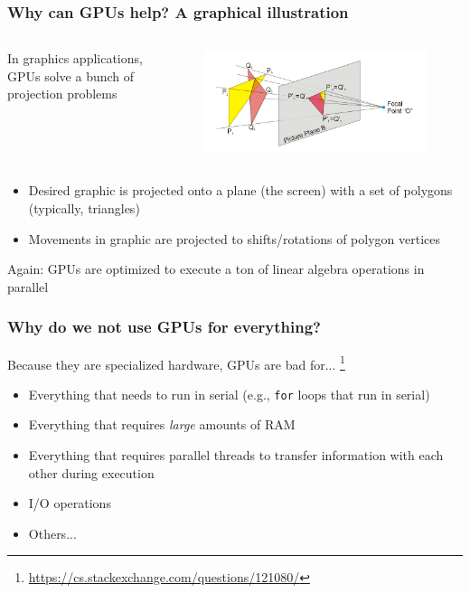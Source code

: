\documentclass[10pt, aspectratio=1610]{beamer}
\begin{document}
\begin{frame}
  \frametitle{Why can GPUs help? A graphical illustration}


  \begin{columns}
    \begin{column}{0.4\textwidth}
      In graphics applications, GPUs solve a bunch of projection problems
    \end{column}
    \begin{column}{0.5\textwidth}
      \begin{figure}
        \centering
        \includegraphics[width=\textwidth]{./img/Perspective_Projection_Principle.jpg}
      \end{figure}
    \end{column}
  \end{columns}

  \begin{itemize}
    \item Desired graphic is projected onto a plane (the screen) with a set of polygons (typically, triangles)
    \item Movements in graphic are projected to shifts/rotations of polygon vertices
  \end{itemize}

  Again: GPUs are optimized to execute a ton of linear algebra operations in parallel

\end{frame}

\begin{frame}
  \frametitle{Why do we not use GPUs for everything?}

  Because they are specialized hardware, GPUs are bad for...%
    \footnote{
      \url{https://cs.stackexchange.com/questions/121080/}
    }

  \begin{itemize}
    \item
      Everything that needs to run in serial (e.g., \texttt{for} loops that run in serial)
    \item
      Everything that requires \emph{large} amounts of RAM
    \item
      Everything that requires parallel threads to transfer information with each other during execution
    \item
      I/O operations
    \item
      Others...
  \end{itemize}

\end{frame}
\end{document}
